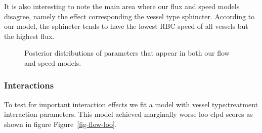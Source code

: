 \documentclass[
  letterpaper,
  DIV=11,
  numbers=noendperiod,
  oneside]{scrartcl}
\theoremstyle{plain}
\theoremstyle{remark}
\begin{document}
It is also interesting to note the main area where our flux and speed
models disagree, namely the effect corresponding the vessel type
sphincter. According to our model, the sphincter tends to have the
lowest RBC speed of all vessels but the highest flux.

\begin{figure}


\caption{\label{fig-flow-shared}Posterior distributions of parameters
that appear in both our flow and speed models.}

\end{figure}%

\subsubsection{Interactions}\label{interactions}

To test for important interaction effects we fit a model with vessel
type:treatment interaction parameters. This model achieved marginally
worse loo elpd scores as shown in figure Figure~\ref{fig-flow-loo}.
\end{document}
